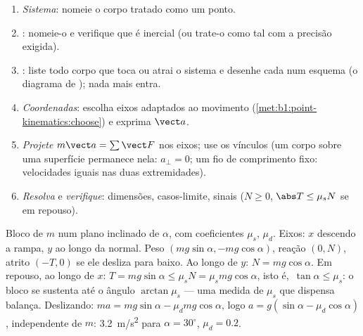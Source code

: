 \begin{method}\label{met:b1:newton-dynamics:method}
\begin{enumerate}
  \item \emph{Sistema}: nomeie o corpo tratado como um ponto.
  \item \emph{}: nomeie-o e verifique que é inercial (ou trate-o
        como tal com a precisão exigida).
  \item \emph{}: liste todo corpo que toca ou atrai o
        sistema e desenhe cada  num esquema (o diagrama de
        ); nada mais entra.
  \item \emph{Coordenadas}: escolha eixos adaptados ao movimento
        (\cref{met:b1:point-kinematics:choose}) e exprima $\vect a$.
  \item \emph{Projete} $m\vect a = \sum\vect F$ nos eixos; use os
        vínculos (um corpo sobre uma superfície permanece nela: $a_\perp = 0$; um
        fio de comprimento fixo: velocidades iguais nas duas extremidades).
  \item \emph{Resolva} e \emph{verifique}: dimensões, casos-limite,
        sinais ($N \geq 0$, $\abs T \leq \mu_sN$ se em repouso).
\end{enumerate}
\end{method}

\begin{example}\label{ex:b1:newton-dynamics:incline}
Bloco de  $m$ num plano inclinado de $\alpha$, com coeficientes $\mu_s$,
$\mu_d$. Eixos: $x$ descendo a rampa, $y$ ao longo da normal. Peso
$(mg\sin\alpha, -mg\cos\alpha)$, reação $(0, N)$, atrito $(-T, 0)$
se ele desliza para baixo. Ao longo de $y$: $N = mg\cos\alpha$. Em repouso, ao longo de $x$:
$T = mg\sin\alpha \leq \mu_sN = \mu_smg\cos\alpha$, isto é,\ $\tan\alpha
\leq \mu_s$: o bloco se sustenta até o ângulo $\arctan\mu_s$ --- uma
medida de $\mu_s$ que dispensa balança. Deslizando: $ma = mg\sin\alpha -
\mu_dmg\cos\alpha$, logo $a = g(\sin\alpha - \mu_d\cos\alpha)$, independente
de $m$: \qty{3.2}{m/s^2} para $\alpha = 30^\circ$, $\mu_d = 0.2$.
\end{example}

